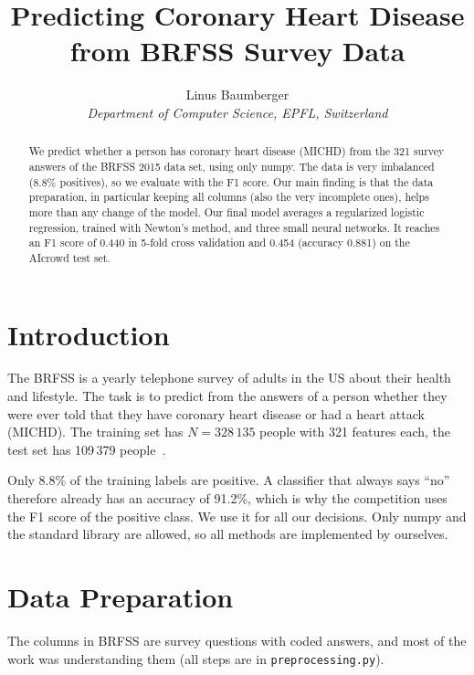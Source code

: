 \documentclass[10pt,conference,compsocconf]{IEEEtran}
\begin{document}
\title{Predicting Coronary Heart Disease from BRFSS Survey Data}

\author{
  Linus Baumberger\\
  \textit{Department of Computer Science, EPFL, Switzerland}
}

\maketitle

\begin{abstract}
  We predict whether a person has coronary heart disease (MICHD) from the 321 survey answers of the BRFSS 2015 data set, using only numpy. The data is very imbalanced (8.8\% positives), so we evaluate with the F1 score. Our main finding is that the data preparation, in particular keeping all columns (also the very incomplete ones), helps more than any change of the model. Our final model averages a regularized logistic regression, trained with Newton's method, and three small neural networks. It reaches an F1 score of 0.440 in 5-fold cross validation and 0.454 (accuracy 0.881) on the AIcrowd test set.
\end{abstract}

\section{Introduction}

The BRFSS is a yearly telephone survey of adults in the US about their health and lifestyle. The task is to predict from the answers of a person whether they were ever told that they have coronary heart disease or had a heart attack (MICHD). The training set has $N = 328\,135$ people with 321 features each, the test set has 109\,379 people~\cite{brfss15}.

Only 8.8\% of the training labels are positive. A classifier that always says ``no'' therefore already has an accuracy of 91.2\%, which is why the competition uses the F1 score of the positive class. We use it for all our decisions. Only numpy and the standard library are allowed, so all methods are implemented by ourselves.

\section{Data Preparation}
\label{sec:prep}

The columns in BRFSS are survey questions with coded answers, and most of the work was understanding them (all steps are in \texttt{preprocessing.py}).
\end{document}
